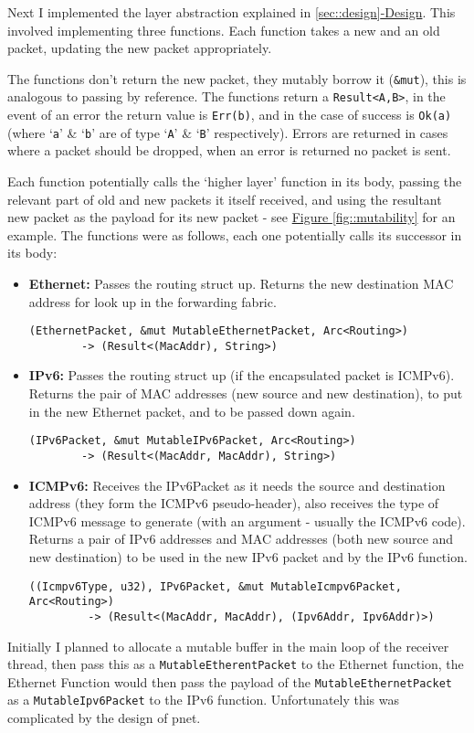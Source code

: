 \documentclass[12pt,a4paper,twoside,openany]{report}
\begin{document}
\bigskip

Next I implemented the layer abstraction explained in \ref{sec::design}\hyperref[sec::design]{-Design}.  This involved implementing three functions. Each function takes a new and an old packet, updating the new packet appropriately.

The functions don't  return the new packet, they mutably borrow it (\verb!&mut!), this is analogous to passing by reference. The functions return a \verb!Result<A,B>!, in the event of an error the return value is \verb!Err(b)!, and in the case of success is \verb!Ok(a)! (where `\verb!a!' \& `\verb!b!' are of type `\verb!A!' \& `\verb!B!' respectively).  Errors are returned in cases where a packet should be dropped, when an error is returned no packet is sent. 

Each function potentially calls the `higher layer' function in its body, passing the relevant part of old and new packets it itself received, and using the resultant new packet as the payload for its new packet - see \hyperref[fig::mutability]{Figure }\ref{fig::mutability} for an example. The functions were as follows, each one potentially calls its successor in its body:
\begin{itemize}
\item \textbf{Ethernet:} Passes the routing struct up. Returns the new destination MAC address for look up in the forwarding fabric.
\begin{verbatim}(EthernetPacket, &mut MutableEthernetPacket, Arc<Routing>)
        -> (Result<(MacAddr), String>)
\end{verbatim}
\item \textbf{IPv6:} Passes the routing struct up (if the encapsulated packet is ICMPv6). Returns the pair of MAC addresses (new source and new destination), to put in the new Ethernet packet, and to be passed down again.
\begin{verbatim}(IPv6Packet, &mut MutableIPv6Packet, Arc<Routing>)
        -> (Result<(MacAddr, MacAddr), String>)
\end{verbatim}
\item \textbf{ICMPv6:} Receives the IPv6Packet as it needs the source and destination address (they form the ICMPv6 pseudo-header), also receives the type of ICMPv6 message to generate (with an argument - usually the ICMPv6 code). Returns a pair of  IPv6 addresses and MAC addresses (both new source and new destination) to be used in the new IPv6 packet and by the IPv6 function.
\begin{verbatim}((Icmpv6Type, u32), IPv6Packet, &mut MutableIcmpv6Packet, Arc<Routing>) 
         -> (Result<(MacAddr, MacAddr), (Ipv6Addr, Ipv6Addr)>)
\end{verbatim}
\end{itemize}
Initially I planned to allocate a mutable buffer in the main loop of the receiver thread, then pass this as a \verb!MutableEtherentPacket! to the Ethernet function, the Ethernet Function would then pass the payload of the \verb!MutableEthernetPacket! as a \verb!MutableIpv6Packet! to the IPv6 function. Unfortunately this was complicated by the design of pnet.  
\end{document}
